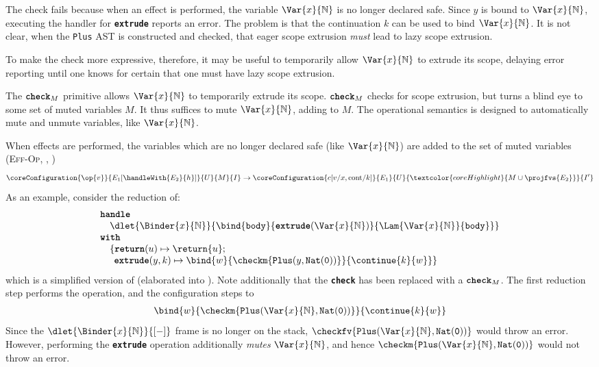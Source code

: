 The check fails because when an effect is performed, the variable $\Var{x}{\mathbb{N}}$ is no longer declared safe. Since $y$ is bound to $\Var{x}{\mathbb{N}}$, executing the handler for \textbf{\texttt{extrude}} reports an error. The problem is that the continuation $k$ can be used to bind $\Var{x}{\mathbb{N}}$. It is not clear, when the \texttt{Plus} AST is constructed and checked, that eager scope extrusion \textit{must} lead to lazy scope extrusion. 

To make the check more expressive, therefore, it may be useful to temporarily allow $\Var{x}{\mathbb{N}}$ to extrude its scope, delaying error reporting until one knows for certain that one must have lazy scope extrusion. 

The $\textbf{\texttt{check}}_M$ primitive allows $\Var{x}{\mathbb{N}}$ to temporarily extrude its scope. $\textbf{\texttt{check}}_M$ checks for scope extrusion, but turns a blind eye to some set of muted variables $M$. It thus suffices to mute $\Var{x}{\mathbb{N}}$, adding to $M$. The \coreLang{} operational semantics is designed to automatically mute and unmute variables, like $\Var{x}{\mathbb{N}}$. 

When effects are performed, the variables which are no longer declared safe (like $\Var{x}{\mathbb{N}}$) are added to the set of muted variables (\textsc{Eff-Op}, , )
\[\coreConfiguration{\op{v}}{E_1[\handleWith{E_2}{h}]}{U}{M}{I} \to \coreConfiguration{c[v/x, \text{cont}/ k]}{E_1}{U}{\textcolor{coreHighlight}{M \cup \projfvs{E_2}}}{I'}\]
As an example, consider the reduction of:
\[\begin{array}{l}
  \textbf{\texttt{handle}} \\
  \quad {\dlet{\Binder{x}{\mathbb{N}}}{
  \bind{\texttt{body}}{\textbf{\texttt{extrude}}(\Var{x}{\mathbb{N}})}{\Lam{\Var{x}{\mathbb{N}}}{\texttt{body}}}}} \\ 
  \textbf{\texttt{with}} \\ 
  \quad \{ \textbf{\texttt{return}}(u) \mapsto {\return{u}}; \\ 
      \quad\;\, \textbf{\texttt{extrude}}(y, k) \mapsto {\bind{w}{\checkm{\texttt{Plus}(y, \texttt{Nat}(\texttt{0}))}}{\continue{k}{w}}}\}
\end{array}\]
which is a simplified version of  (elaborated into \coreLang{}). Note additionally that the \textbf{\texttt{check}} has been replaced with a $\textbf{\texttt{check}}_M$. The first reduction step performs the operation, and the configuration steps to
\[\begin{array}{l}
  \bind{w}{\checkm{\texttt{Plus}(\Var{x}{\mathbb{N}}, \texttt{Nat}(\texttt{0}))}}{\continue{k}{w}}
\end{array}\]
Since the $\dlet{\Binder{x}{\mathbb{N}}}{[-]}$ frame is no longer on the stack, $\checkfv{\texttt{Plus}(\Var{x}{\mathbb{N}}, \texttt{Nat}(\texttt{0}))}$ would throw an error. However, performing the \textbf{\texttt{extrude}} operation additionally \textit{mutes} $\Var{x}{\mathbb{N}}$, and hence $\checkm{\texttt{Plus}(\Var{x}{\mathbb{N}}, \texttt{Nat}(\texttt{0}))}$  would not throw an error. 

